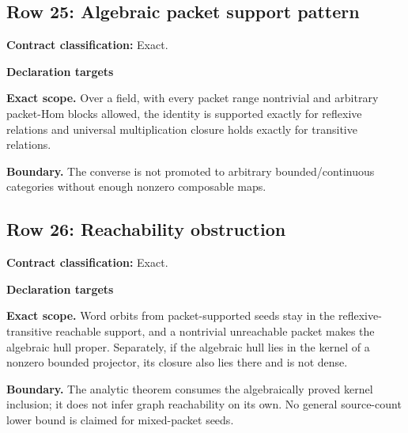 \subsection{Row 25: Algebraic packet support pattern}
\label{row:25}
\textbf{Contract classification:} Exact.
\par\smallskip\textbf{Declaration targets}\par
{\small\noindent{}\par}
{\small\noindent{}\par}
\medskip\noindent\textbf{Exact scope.} Over a field, with every packet range nontrivial and arbitrary packet-Hom blocks allowed, the identity is supported exactly for reflexive relations and universal multiplication closure holds exactly for transitive relations.
\par\smallskip\noindent\textbf{Boundary.} The converse is not promoted to arbitrary bounded/continuous categories without enough nonzero composable maps.
\medskip
\subsection{Row 26: Reachability obstruction}
\label{row:26}
\textbf{Contract classification:} Exact.
\par\smallskip\textbf{Declaration targets}\par
{\small\noindent{}\par}
{\small\noindent{}\par}
{\small\noindent{}\par}
{\small\noindent{}\par}
\medskip\noindent\textbf{Exact scope.} Word orbits from packet-supported seeds stay in the reflexive-transitive reachable support, and a nontrivial unreachable packet makes the algebraic hull proper. Separately, if the algebraic hull lies in the kernel of a nonzero bounded projector, its closure also lies there and is not dense.
\par\smallskip\noindent\textbf{Boundary.} The analytic theorem consumes the algebraically proved kernel inclusion; it does not infer graph reachability on its own. No general source-count lower bound is claimed for mixed-packet seeds.
\medskip

